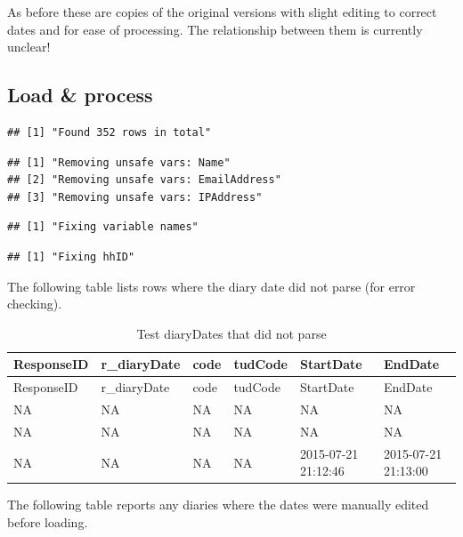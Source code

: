 \documentclass[]{article}
\begin{document}
As before these are copies of the original versions with slight editing
to correct dates and for ease of processing. The relationship between
them is currently unclear!

\subsection{Load \& process}\label{load-process-1}

\begin{verbatim}
## [1] "Found 352 rows in total"
\end{verbatim}

\begin{verbatim}
## [1] "Removing unsafe vars: Name"        
## [2] "Removing unsafe vars: EmailAddress"
## [3] "Removing unsafe vars: IPAddress"
\end{verbatim}

\begin{verbatim}
## [1] "Fixing variable names"
\end{verbatim}

\begin{verbatim}
## [1] "Fixing hhID"
\end{verbatim}

The following table lists rows where the diary date did not parse (for
error checking).

\begin{longtable}[]{@{}llllll@{}}
\caption{Test diaryDates that did not parse}\tabularnewline
\toprule
ResponseID & r\_diaryDate & code & tudCode & StartDate &
EndDate\tabularnewline
\midrule
\endfirsthead
\toprule
ResponseID & r\_diaryDate & code & tudCode & StartDate &
EndDate\tabularnewline
\midrule
\endhead
NA & NA & NA & NA & NA & NA\tabularnewline
NA & NA & NA & NA & NA & NA\tabularnewline
NA & NA & NA & NA & 2015-07-21 21:12:46 & 2015-07-21
21:13:00\tabularnewline
\bottomrule
\end{longtable}

The following table reports any diaries where the dates were manually
edited before loading.
\end{document}
